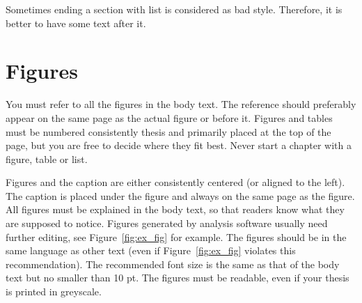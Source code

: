 \documentclass[12pt,a4paper,finnish]{tutthesis}
\begin{document}
Sometimes ending a section with list is considered as bad
style. Therefore, it is better to have some text after it.


\section{Figures}
You must refer to all the figures in the body text. The reference
should preferably appear on the same page as the actual figure or
before it. Figures and tables must be numbered consistently thesis
and primarily placed at the top of the page, but you are free to
decide where they fit best. Never start a chapter with a figure, table
or list.

Figures and the caption are either consistently centered (or aligned
to the left). The caption is placed under the figure and always on the
same page as the figure. All figures must be explained in the body
text, so that readers know what they are supposed to notice. Figures
generated by analysis software usually need further editing, see
Figure~\ref{fig:ex_fig} for example. The figures should be in the same
language as other text (even if Figure~\ref{fig:ex_fig} violates this
recommendation). The recommended font size is the same as that of the
body text but no smaller than 10 pt. The figures must be readable,
even if your thesis is printed in greyscale.


\end{document}
